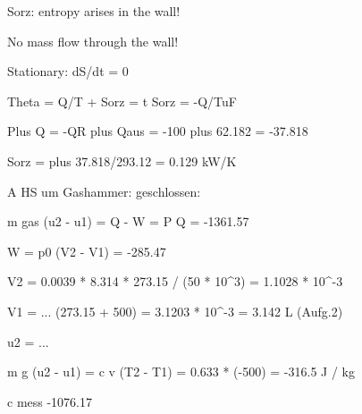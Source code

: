 Sorz: entropy arises in the wall!

No mass flow through the wall!

Stationary: dS/dt = 0

Theta = Q/T + Sorz = t Sorz = -Q/TuF

Plus Q = -QR plus Qaus = -100 plus 62.182 = -37.818

Sorz = plus 37.818/293.12 = 0.129 kW/K

A HS um Gashammer: geschlossen:

m gas (u2 - u1) = Q - W = P Q = -1361.57

W = p0 (V2 - V1) = -285.47

V2 = 0.0039 * 8.314 * 273.15 / (50 * 10^3) = 1.1028 * 10^-3

V1 = ... (273.15 + 500) = 3.1203 * 10^-3 = 3.142 L (Aufg.2)

u2 = ...

m g (u2 - u1) = c v (T2 - T1) = 0.633 * (-500) = -316.5 J / kg

c mess -1076.17